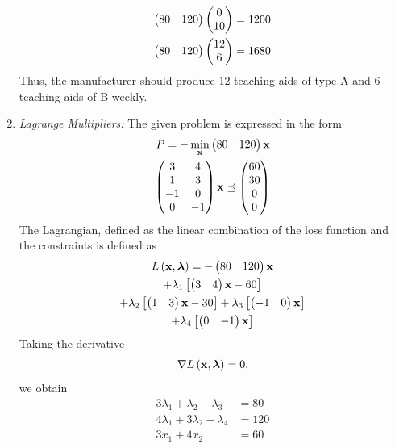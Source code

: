 \documentclass[journal,12pt,twocolumn]{IEEEtran}
\begin{document}
\begin{flushleft}
\begin{enumerate}
\begin{align}
                  \begin{pmatrix}80 & 120\end{pmatrix}\begin{pmatrix}0  \\ 10\end{pmatrix} &= 1200 \\
                  \begin{pmatrix}80 & 120\end{pmatrix}\begin{pmatrix}12 \\ 6\end{pmatrix} &= 1680
              \end{align}
              Thus, the manufacturer should produce 12 teaching aids of type A and 6 teaching aids of B weekly.
        \item {\em Lagrange Multipliers: } The given problem is expressed in the form
              \begin{align}
                  P = -\min_{\mathbf{x}}\begin{pmatrix}80 & 120\end{pmatrix}\mathbf{x}
                  \\
                  \begin{pmatrix}3                     & 4           \\ 1 & 3 \\ -1 & 0 \\ 0 & -1\end{pmatrix} \mathbf{x}\preceq \begin{pmatrix}60 \\ 30 \\0 \\ 0\end{pmatrix}
              \end{align}
              The Lagrangian, defined as the linear combination of the loss function and the constraints is defined as
              \begin{multline}
                  L\left(\mathbf{x},\bm{\lambda}\right) =-\begin{pmatrix}80 & 120\end{pmatrix}\mathbf{x}
                  \\
                  + \lambda_1{}\left[\begin{pmatrix}3 & 4\end{pmatrix}\mathbf{x}-60\right]
                  \\
                  +
                  \lambda_2{}\left[\begin{pmatrix}1 & 3\end{pmatrix}\mathbf{x}-30\right]+
                  \lambda_3{}\left[\begin{pmatrix}-1 & 0\end{pmatrix}\mathbf{x}\right]
                  \\
                  +
                  \lambda_4{}\left[\begin{pmatrix}0 & -1\end{pmatrix}\mathbf{x}\right]
              \end{multline}
              Taking the derivative
              \begin{align}
                  {\nabla L\ensuremath{\left(\mathbf{x},\bm{\lambda}\right)}} = 0,
              \end{align}
              we obtain
              \begin{align}
                  3\lambda_1 + \lambda_2 -\lambda_3  & = 80
                  \\
                  4\lambda_1 + 3\lambda_2 -\lambda_4 & = 120
                  \\
                  3x_1 + 4x_2                        & = 60
                  \\

\end{align}
\end{enumerate}
\end{flushleft}
\end{document}

